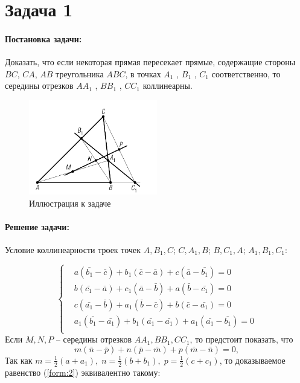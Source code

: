 \section*{Задача 1}
\paragraph{Постановка задачи:}
Доказать, что если некоторая прямая пересекает прямые, содержащие стороны \(BC\), \(CA\), \(AB\) треугольника \(ABC\), в точках \(A_1\) , \(B_1\) , \(C_1\) соответственно, то середины отрезков \(AA_1\) , \(BB_1\) , \(CC_1\) коллинеарны.
\begin{figure}[h]
    \centering
    \includegraphics[width=0.5\textwidth]{images/task1.png}
    \caption{Иллюстрация к задаче}
    \label{task1}
\end{figure}
\paragraph{Решение задачи:}
Условие коллинеарности троек точек \(A, B_1 , C\); \(C,
A_1 , B\); \(B, C_1 , A\); \(A_1 , B_1 , C_1\):

\begin{equation}
    \left\{ \begin{aligned}
         & a(\bar{b_1} - \bar{c}) + b_1(\bar{c} - \bar{a}) + c(\bar{a} - \bar{b_1}) = 0             \\
         & b(\bar{c_1} - \bar{a}) + c_1(\bar{a} - \bar{b}) + a(\bar{b} - \bar{c_1}) = 0             \\
         & c(\bar{a_1} - \bar{b}) + a_1(\bar{b} - \bar{c}) + b(\bar{c} - \bar{a_1}) = 0             \\
         & a_1(\bar{b_1} - \bar{a_1}) + b_1(\bar{a_1} - \bar{a_1}) + a_1(\bar{a_1} - \bar{b_1}) = 0 \\
    \end{aligned}
    \right. \label{form:1}
\end{equation}
Если \(M, N, P\) -- середины отрезков \(AA_1, BB_1, CC_1\), то предстоит показать, что
\begin{equation}
    m(\bar{n} -\bar{p})+n(\bar{p}-\bar{m})+p(\bar{m}-\bar{n})=0,
    \label{form:2}
\end{equation}
Так как \(\displaystyle
m=\frac{1}{2}(a+a_1),\;
n=\frac{1}{2}(b+b_1),\;
p=\frac{1}{2}(c+c_1)
\), то доказываемое равенство (\ref{form:2}) эквивалентно такому:

